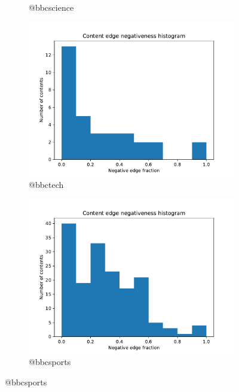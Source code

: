 \documentclass{beamer}
\begin{document}
\begin{frame}[c]
\begin{figure}
\begin{center}
\begin{subfigure}[b]{0.4\textwidth}
                \caption{@bbcscience}
                \label{fig:out/bbcscience200/neg-fraction-content-hist.pdf}
            \end{subfigure}
            \begin{subfigure}[b]{0.4\textwidth}
                \centering
                \includegraphics[width=\textwidth]{out/bbctech200/neg-fraction-content-hist.pdf}
                \caption{@bbctech}
                \label{fig:out/emanews200/neg-fraction-content-hist.pdf}
            \end{subfigure}
            \begin{subfigure}[b]{0.4\textwidth}
                \centering
                \includegraphics[width=\textwidth]{out/bbcsport200/neg-fraction-content-hist.pdf}
                \caption{@bbcsports}
                \label{fig:out/bbcscience200/neg-fraction-content-hist.pdf}
            \end{subfigure}
        \end{center}
    \end{figure}

\end{frame}
\end{document}
